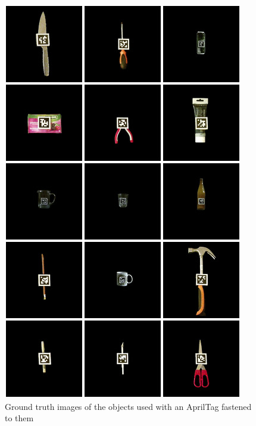 \begin{figure}
	\centering
	\includegraphics[width=\textwidth]{img/methods/objects.jpg}
	\caption{Ground truth images of the objects used with an AprilTag fastened to them}
	\label{fig:objects_montage}
\end{figure}

